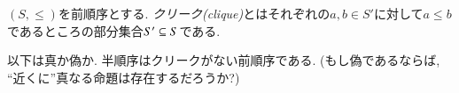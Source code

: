 \begin{definition}\label{def:clique}


$(S,\leq)$を前順序とする. \emph{クリーク(clique)}とはそれぞれの$a,b\in S'$に対して$a\leq b$であるところの部分集合$S'\ss S$である.

\end{definition}

\begin{exercise}
以下は真か偽か. 半順序はクリークがない前順序である. (もし偽であるならば, ``近くに''真なる命題は存在するだろうか?)
\end{exercise}

